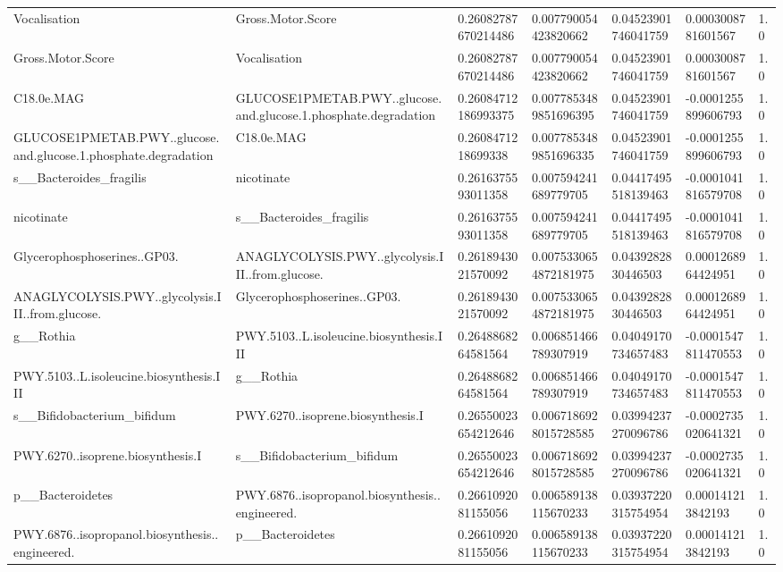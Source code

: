 \begin{longtable}{lllllll}
Vocalisation & Gross.Motor.Score & 0.26082787670214486 & 0.007790054423820662 & 0.04523901746041759 & 0.0003008781601567 & 1.0 \\
Gross.Motor.Score & Vocalisation & 0.26082787670214486 & 0.007790054423820662 & 0.04523901746041759 & 0.0003008781601567 & 1.0 \\
C18.0e.MAG & GLUCOSE1PMETAB.PWY..glucose.and.glucose.1.phosphate.degradation & 0.26084712186993375 & 0.0077853489851696395 & 0.04523901746041759 & -0.0001255899606793 & 1.0 \\
GLUCOSE1PMETAB.PWY..glucose.and.glucose.1.phosphate.degradation & C18.0e.MAG & 0.2608471218699338 & 0.0077853489851696335 & 0.04523901746041759 & -0.0001255899606793 & 1.0 \\
s\_\_Bacteroides\_fragilis & nicotinate & 0.2616375593011358 & 0.007594241689779705 & 0.04417495518139463 & -0.0001041816579708 & 1.0 \\
nicotinate & s\_\_Bacteroides\_fragilis & 0.2616375593011358 & 0.007594241689779705 & 0.04417495518139463 & -0.0001041816579708 & 1.0 \\
Glycerophosphoserines..GP03. & ANAGLYCOLYSIS.PWY..glycolysis.III..from.glucose. & 0.2618943021570092 & 0.0075330654872181975 & 0.0439282830446503 & 0.0001268964424951 & 1.0 \\
ANAGLYCOLYSIS.PWY..glycolysis.III..from.glucose. & Glycerophosphoserines..GP03. & 0.2618943021570092 & 0.0075330654872181975 & 0.0439282830446503 & 0.0001268964424951 & 1.0 \\
g\_\_Rothia & PWY.5103..L.isoleucine.biosynthesis.III & 0.2648868264581564 & 0.006851466789307919 & 0.04049170734657483 & -0.0001547811470553 & 1.0 \\
PWY.5103..L.isoleucine.biosynthesis.III & g\_\_Rothia & 0.2648868264581564 & 0.006851466789307919 & 0.04049170734657483 & -0.0001547811470553 & 1.0 \\
s\_\_Bifidobacterium\_bifidum & PWY.6270..isoprene.biosynthesis.I & 0.26550023654212646 & 0.0067186928015728585 & 0.03994237270096786 & -0.0002735020641321 & 1.0 \\
PWY.6270..isoprene.biosynthesis.I & s\_\_Bifidobacterium\_bifidum & 0.26550023654212646 & 0.0067186928015728585 & 0.03994237270096786 & -0.0002735020641321 & 1.0 \\
p\_\_Bacteroidetes & PWY.6876..isopropanol.biosynthesis..engineered. & 0.2661092081155056 & 0.006589138115670233 & 0.03937220315754954 & 0.000141213842193 & 1.0 \\
PWY.6876..isopropanol.biosynthesis..engineered. & p\_\_Bacteroidetes & 0.2661092081155056 & 0.006589138115670233 & 0.03937220315754954 & 0.000141213842193 & 1.0 \\

\end{longtable}
